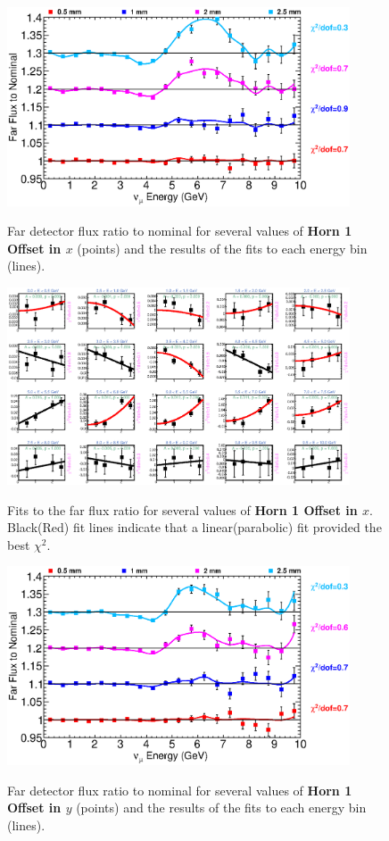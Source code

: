 \begin{figure}[ht]
  \begin{center}
    {\includegraphics[width=4.0in]{figures/Horn1XOffset_far_summary.eps}}
  \end{center}
\caption{ Far detector flux ratio to nominal for several values of {\bf Horn 1 Offset in $x$} (points) and the results of the fits to each energy bin (lines).}
\end{figure}

\begin{figure}[hb]
  \begin{center}
    {\includegraphics[width=4.0in]{figures/Horn1XOffset_far_fits.eps}}
  \end{center}
\caption{ Fits to the far flux ratio for several values of {\bf Horn 1 Offset in $x$}. Black(Red) fit lines indicate that a linear(parabolic) fit provided the best $\chi^2$. }
\end{figure}

\begin{figure}[ht]
  \begin{center}
    {\includegraphics[width=4.0in]{figures/Horn1YOffset_far_summary.eps}}
  \end{center}
\caption{ Far detector flux ratio to nominal for several values of {\bf Horn 1 Offset in $y$} (points) and the results of the fits to each energy bin (lines).}
\end{figure}

